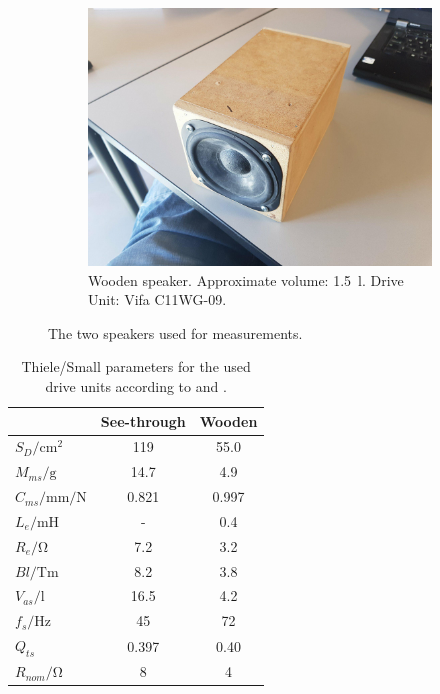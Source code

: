 \begin{figure}
\begin{subfigure}{.5\textwidth}
		\includegraphics[width=.9\linewidth, clip, trim={17cm 3cm 14cm 0}]{gfx/Speaker_wood.jpg}
		\caption{Wooden speaker. Approximate volume: \SI{1.5}{\litre}. Drive Unit: Vifa C11WG-09.}
		\label{fig:measspeak2}
	\end{subfigure}
	\caption{The two speakers used for measurements.}
	\label{fig:measspeak}
\end{figure}

\begin{table}
	\centering
	\begin{tabular}{l c c}
		\toprule
		 & \textbf{See-through} & \textbf{Wooden} \\
 		 \midrule
		 $S_D/\si{\centi\meter\squared}$ & \num{119} & \num{55.0} \\
		 $M_{ms}/\si{\gram}$ & \num{14.7} & \num{4.9} \\
		 $C_{ms}/\si{\milli\metre\per\newton}$ & \num{0.821} & \num{0.997} \\
		 $L_e/\si{\milli\henry}$ & - & \num{0.4} \\
		 $R_e/\si{\ohm}$ & \num{7.2} & \num{3.2} \\
		 $Bl/\si{\tesla\metre}$ & \num{8.2} & \num{3.8} \\
		 $V_{as}/\si{\litre}$ & \num{16.5} & \num{4.2} \\
		 $f_s/\si{\hertz}$ & \num{45} & \num{72} \\
		 $Q_{ts}$ & \num{0.397} & \num{0.40} \\
		 $R_{nom}/\si{\ohm}$ & \num{8} & \num{4} \\
		 \bottomrule
	\end{tabular}
	\caption{Thiele/Small parameters for the used drive units according to \cite{vifa} and \cite{fountek}.}
	\label{tab:thielesmall}
\end{table}

%
%


